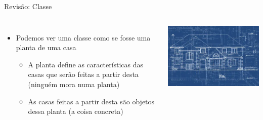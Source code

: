 \documentclass[portuguese, aspectratio=169, xcolor=table]{beamer}
\begin{document}
\begin{frame}{Revisão: Classe}
\begin{columns}
\begin{itemize}
    \item Podemos ver uma classe como se fosse uma planta de uma casa
    \begin{itemize}
        \item A planta define as características das casas que serão feitas a partir desta (ninguém mora numa planta)
        \item As casas feitas a partir desta são objetos dessa planta (a coisa concreta)
    \end{itemize}
\end{itemize}
\begin{center}
    \includegraphics[width=\linewidth]{./figures/blueprint}
\end{center}
\end{columns}
\end{frame}
\end{document}
